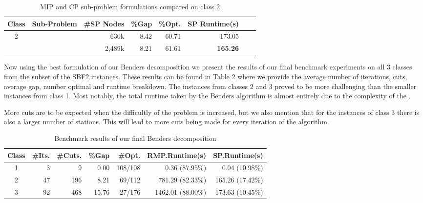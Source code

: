 \begin{table}[tpb]
	\caption{MIP and CP sub-problem formulations compared on class 2}
	\centering
	\vspace{2mm}
	\begin{tabular}{ccrrrrrr}
		\toprule
		Class & Sub-Problem & \#SP Nodes & \%Gap & \%Opt. & SP Runtime(s) \\\midrule\midrule
		2 & \spmip{} & 630k & 8.42 & 60.71 & 173.05 \\
		 & \spcp{} & 2,489k & 8.21 & 61.61 & \bf{165.26} \\
		\bottomrule
	\end{tabular}
	\label{tab:exp:resultsSPform}
\end{table}

Now using the best formulation of our Benders decomposition
we present the results of our final benchmark experiments 
on all 3 classes from the subset of the SBF2 instances.
These results can be found in Table \ref{tab:exp:resultsBestBenders}
where we provide the average number of iterations,
cuts, average gap, number optimal and runtime breakdown.
The instances from classes 2 and 3 proved to be more
challenging than the smaller instances from class 1.
Most notably, the total runtime taken by
the Benders algorithm is almost entirely due to the complexity of the \rmp{}.

More cuts are to be expected when the difficultly of the problem
is increased, but we also mention that for the instances of class 3
there is also a larger number of stations.
This will lead to more cuts being made for every iteration of the algorithm.

\begin{table}[tpb]
	\caption{Benchmark results of our final Benders decomposition}
	\centering
	\vspace{2mm}
	\begin{tabular}{crrrrrr}
		\toprule
		Class & \#Its. & \#Cuts. & \%Gap & \#Opt. & RMP.Runtime(s) & SP.Runtime(s) \\\midrule\midrule
		1 & 3 & 9 & 0.00 & 108/108 & 0.36 (87.95\%) & 0.04 (10.98\%) \\
		2 & 47 & 196 & 8.21 & 69/112 & 781.29 (82.33\%) & 165.26 (17.42\%) \\
		3 & 92 & 468 & 15.76 & 27/176 & 1462.01 (88.00\%) & 173.63 (10.45\%) \\
		\bottomrule
	\end{tabular}
	\label{tab:exp:resultsBestBenders}
\end{table}

